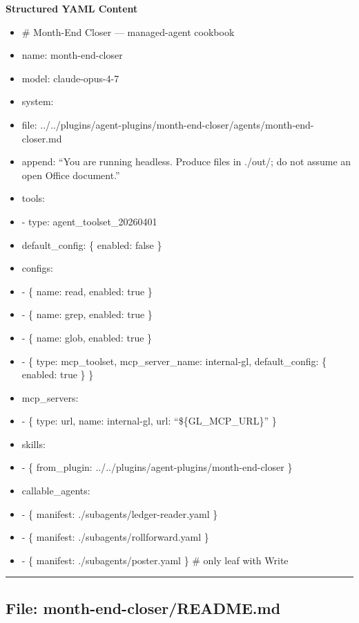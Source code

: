 \documentclass[11pt]{article}
\begin{document}
\textbf{Structured YAML Content}
\begin{itemize}[leftmargin=*,itemsep=2pt,topsep=2pt]
\item {} \# Month-End Closer — managed-agent cookbook
\item {} name: month-end-closer
\item {} model: claude-opus-4-7
\item {} system:
\item {} file: ../../plugins/agent-plugins/month-end-closer/agents/month-end-closer.md
\item {} append: ``You are running headless. Produce files in ./out/; do not assume an open Office document.''
\item {} tools:
\item {} - type: agent\_\allowbreak{}toolset\_\allowbreak{}20260401
\item {} default\_\allowbreak{}config: \{ enabled: false \}
\item {} configs:
\item {} - \{ name: read, enabled: true \}
\item {} - \{ name: grep, enabled: true \}
\item {} - \{ name: glob, enabled: true \}
\item {} - \{ type: mcp\_\allowbreak{}toolset, mcp\_\allowbreak{}server\_\allowbreak{}name: internal-gl, default\_\allowbreak{}config: \{ enabled: true \} \}
\item {} mcp\_\allowbreak{}servers:
\item {} - \{ type: url, name: internal-gl, url: ``\$\{GL\_\allowbreak{}MCP\_\allowbreak{}URL\}'' \}
\item {} skills:
\item {} - \{ from\_\allowbreak{}plugin: ../../plugins/agent-plugins/month-end-closer \}
\item {} callable\_\allowbreak{}agents:
\item {} - \{ manifest: ./subagents/ledger-reader.yaml \}
\item {} - \{ manifest: ./subagents/rollforward.yaml \}
\item {} - \{ manifest: ./subagents/poster.yaml \} \# only leaf with Write
\end{itemize}

\vspace{0.8em}\hrule\vspace{0.8em}

\subsection{File: month-end-closer/README.md}\label{file:month-end-closer-README-md}
\end{document}
